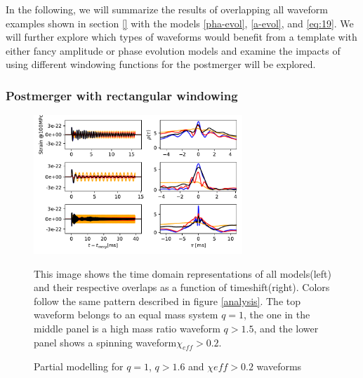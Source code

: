 In the following, we will summarize the results of overlapping all waveform examples shown in section \ref{} with the models \ref{pha-evol}, \ref{a-evol}, and \ref{eq:19}. We will further explore which types of waveforms would benefit from a template with either fancy amplitude or phase evolution models and examine the impacts of using different windowing functions for the postmerger will be explored.


\subsubsection*{Postmerger with rectangular windowing}

\begin{figure}[hbt!]
\begin{center}
\includegraphics[width=0.7\textwidth, angle=0]{images/Data_analysis/results/phi-A1.pdf}
\caption{Partial modelling for $q=1$, $q>1.6$ and $\chi{eff}>0.2$ waveforms}
\end{center}
This image shows the time domain representations of all models(left) and their respective overlaps as a function of timeshift(right). Colors follow the same pattern described in figure \ref{analysis}. The top waveform belongs to an equal mass system $q=1$, the one in the middle panel is a high mass ratio waveform $q>1.5$, and the lower panel shows a spinning waveform$\chi_{eff}>0.2$.
\end{figure}

